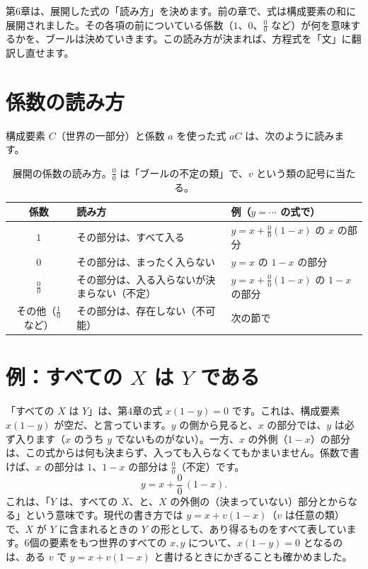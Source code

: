 \documentclass[a4paper,11pt,openany]{ltjsbook}
\begin{document}
第6章は、展開した式の「読み方」を決めます。前の章で、式は構成要素の和に展開されました。その各項の前についている係数（$1$、$0$、$\tfrac00$ など）が何を意味するかを、ブールは決めていきます。この読み方が決まれば、方程式を「文」に翻訳し直せます。

\section{係数の読み方}

構成要素 $C$（世界の一部分）と係数 $a$ を使った式 $aC$ は、次のように読みます。

\begin{table}[htbp]
\centering
\small
\begin{tabular}{cp{4.6cm}p{5.6cm}}
\toprule
係数 & 読み方 & 例（$y=\cdots$ の式で）\\
\midrule
$1$ & その部分は、すべて入る & $y=x+\tfrac00(1-x)$ の $x$ の部分\\
$0$ & その部分は、まったく入らない & $y=x$ の $1-x$ の部分\\
$\tfrac00$ & その部分は、入る入らないが決まらない（不定） & $y=x+\tfrac00(1-x)$ の $1-x$ の部分\\
その他（$\tfrac10$ など） & その部分は、存在しない（不可能） & 次の節で\\
\bottomrule
\end{tabular}
\caption{展開の係数の読み方。$\tfrac00$ は「ブールの不定の類」で、$v$ という類の記号に当たる。}
\end{table}

\section{例：すべての $X$ は $Y$ である}

「すべての $X$ は $Y$」は、第4章の式 $x(1-y)=0$ です。これは、構成要素 $x(1-y)$ が空だ、と言っています。$y$ の側から見ると、$x$ の部分では、$y$ は必ず入ります（$x$ のうち $y$ でないものがない）。一方、$x$ の外側（$1-x$）の部分は、この式からは何も決まらず、入っても入らなくてもかまいません。係数で書けば、$x$ の部分は $1$、$1-x$ の部分は $\tfrac00$（不定）です。
\[
y=x+\frac{0}{0}\,(1-x).
\]
これは、「$Y$ は、すべての $X$、と、$X$ の外側の（決まっていない）部分とからなる」という意味です。現代の書き方では $y=x+v(1-x)$（$v$ は任意の類）で、$X$ が $Y$ に含まれるときの $Y$ の形として、あり得るものをすべて表しています。6個の要素をもつ世界のすべての $x,y$ について、$x(1-y)=0$ となるのは、ある $v$ で $y=x+v(1-x)$ と書けるときにかぎることも確かめました。
\end{document}
